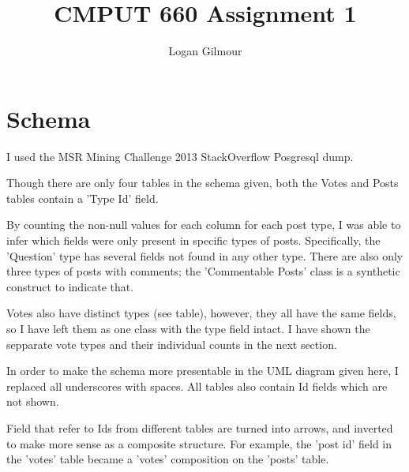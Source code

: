 \documentclass{article}
\begin{document}
\title{CMPUT 660 Assignment 1}
\author{Logan Gilmour}

\maketitle


\section{Schema}

I used the MSR Mining Challenge 2013 StackOverflow Posgresql dump\cite{MSRChallenge2013}.

Though there are only four tables in the schema given, both the Votes and Posts tables contain a 'Type Id' field.

By counting the non-null values for each column for each post type, I was able to infer which fields were only present in specific types of posts. Specifically, the 'Question' type has several fields not found in any other type. There are also only three types of posts with comments; the 'Commentable Posts' class is a synthetic construct to indicate that.

Votes also have distinct types (see table), however, they all have the same fields, so I have left them as one class with the type field intact. I have shown the sepparate vote types and their individual counts in the next section.

In order to make the schema more presentable in the UML diagram given here, I replaced all underscores with spaces. All tables also contain Id fields which are not shown.

Field that refer to Ids from different tables are turned into arrows, and inverted to make more sense as a composite structure. For example, the 'post id' field in the 'votes' table became a 'votes' composition on the 'posts' table.
\end{document}
